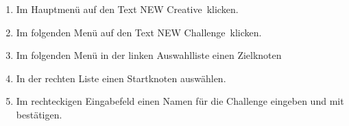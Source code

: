 \begin{description}
\begin{enumerate}
		\item Im Hauptmenü auf den Text \glqq NEW Creative\grqq~klicken.
		\item Im folgenden Menü auf den Text \glqq NEW Challenge\grqq~klicken.
		\item Im folgenden Menü in der linken Auswahlliste einen Zielknoten
		\item In der rechten Liste einen Startknoten auswählen.
		\item Im rechteckigen Eingabefeld einen Namen für die Challenge eingeben und mit bestätigen.
		
	\end{enumerate}


\end{description}









